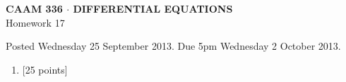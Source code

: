 \documentclass[10pt]{article}
\begin{document}
\vspace*{-5em}
\begin{center}
\large \textsf{\textbf{CAAM 336 $\cdot$ DIFFERENTIAL EQUATIONS}\\[0.5em]
Homework 17 }
\end{center}

Posted Wednesday 25 September 2013.  Due 5pm Wednesday 2 October 2013.

\begin{enumerate}\addtocounter{enumi}{16}
\item {[25 points]}  
\end{enumerate}
\end{document}
